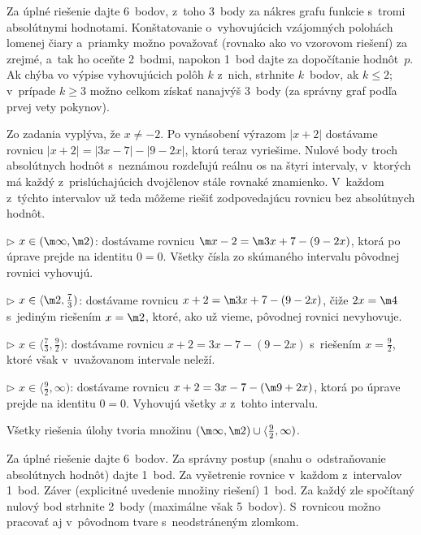 {\nobreak\medskip\petit\noindent
Za úplné riešenie dajte 6~bodov, z~toho 3~body za nákres grafu funkcie
s~tromi absolútnymi hodnotami.
Konštatovanie o~vyhovujúcich vzájomných polohách lomenej čiary a~priamky
možno považovať (rovnako ako vo vzorovom riešení) za zrejmé, a~tak ho oceňte 2~bodmi,
napokon 1~bod dajte za dopočítanie hodnôt~$p$. Ak chýba vo výpise vyhovujúcich
polôh $k$ z~nich, strhnite $k$~bodov, ak $k\le2$; v~prípade $k\ge3$
možno celkom získať nanajvýš 3~body (za správny graf podľa prvej vety pokynov).

\endpetit
\bigbreak
}

{%
Zo zadania vyplýva, že $x\ne -2$. Po vynásobení výrazom $|x+2|$ dostávame
rovnicu $|x+2|=|3x-7|-|9-2x|$, ktorú teraz vyriešime.
Nulové body troch absolútnych hodnôt s~neznámou rozdeľujú reálnu os
na štyri intervaly, v~ktorých má každý z~prislúchajúcich dvojčlenov stále rovnaké znamienko. V~každom z~týchto intervalov už teda môžeme
riešiť zodpovedajúcu rovnicu bez absolútnych hodnôt.
\item{$\triangleright$} $x\in (\m\infty, \m2)$: dostávame rovnicu
$\m x-2=\m3x+7-(9-2x)$, ktorá po úprave prejde na identitu $0=0$.
Všetky čísla zo skúmaného intervalu pôvodnej rovnici vyhovujú.
\item{$\triangleright$} $x\in \langle \m2,\frac73)$:
dostávame rovnicu $x+2=\m3x+7-(9-2x)$, čiže $2x=\m4$ s~jediným riešením $x=\m2$,
ktoré, ako už vieme, pôvodnej rovnici nevyhovuje.
\item{$\triangleright$} $x\in\langle \frac73,\frac92)$: dostávame rovnicu
$x+2=3x-7-(9-2x)$ s~riešením $x=\frac92$, ktoré však v~uvažovanom intervale neleží.
\item{$\triangleright$} $x\in\langle \frac92, \infty)$: dostávame rovnicu $x+2=3x-7-(\m9+2x)$,
ktorá po úprave prejde na identitu $0=0$. Vyhovujú všetky $x$ z~tohto intervalu.

\zaver
Všetky riešenia úlohy tvoria množinu $(\m\infty,\m2)\cup\langle\frac 92,\infty)$.

\nobreak\medskip\petit\noindent
Za úplné riešenie dajte 6~bodov. Za správny postup (snahu o~odstraňovanie absolútnych hodnôt)
dajte 1~bod. Za vyšetrenie rovnice v~každom z~intervalov 1~bod. Záver (explicitné uvedenie
množiny riešení) 1~bod. Za každý zle spočítaný nulový bod strhnite 2~body
(maximálne však 5~bodov). S~rovnicou možno pracovať aj v~pôvodnom tvare s~neodstráneným zlomkom.

\endpetit
\bigbreak
}

